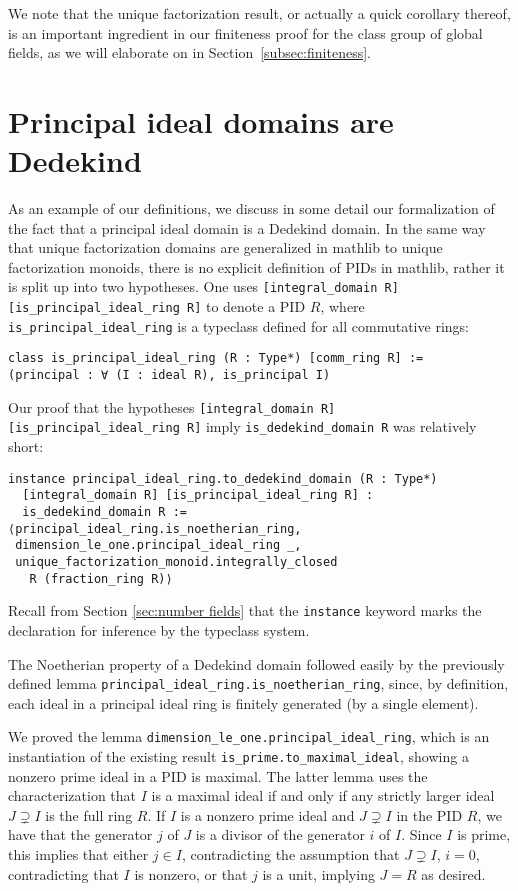 \documentclass[sn-mathphys]{sn-jnl}%
\newcommand{\lean}[1]{\texttt{#1}\xspace}
\newcommand{\mathlib}{\textsf{mathlib}\xspace}
\begin{document}
We note that the unique factorization result, or actually a quick corollary thereof, is an important ingredient in our finiteness proof for the class group of global fields, as we will elaborate on in Section~\ref{subsec:finiteness}.

\section{Principal ideal domains are Dedekind}

As an example of our definitions, we discuss in some detail our formalization of the fact that a principal ideal domain is a Dedekind domain.
In the same way that unique factorization domains are generalized in \mathlib to unique factorization monoids,
there is no explicit definition of PIDs in \mathlib, rather it is split up into two hypotheses.
One uses \lean{[integral\_domain R] [is\_principal\_ideal\_ring R]} to denote a PID $R$,
where \lean{is\_principal\_\-ideal\_\-ring} is a typeclass defined for all commutative rings:
\begin{lstlisting}
class is_principal_ideal_ring (R : Type*) [comm_ring R] :=
(principal : ∀ (I : ideal R), is_principal I)
\end{lstlisting}

Our proof that the hypotheses \lean{[integral\_domain R] [is\_principal\_\-ideal\_\-ring R]} imply \lean{is\_dedekind\_domain R} was relatively short:
\begin{lstlisting}
instance principal_ideal_ring.to_dedekind_domain (R : Type*)
  [integral_domain R] [is_principal_ideal_ring R] :
  is_dedekind_domain R :=
⟨principal_ideal_ring.is_noetherian_ring,
 dimension_le_one.principal_ideal_ring _,
 unique_factorization_monoid.integrally_closed
   R (fraction_ring R)⟩
\end{lstlisting}
Recall from Section \ref{sec:number fields} that the \lean{instance} keyword marks the declaration for inference by the typeclass system.

The Noetherian property of a Dedekind domain followed easily by the previously defined lemma \lean{principal\_ideal\_ring.is\_noetherian\_ring}, since, by definition, each ideal in a principal ideal ring is finitely generated (by a single element).

We proved the lemma \lean{dimension\_le\_one.principal\_ideal\_ring}, which is an instantiation of the existing result \lean{is\_prime.to\_maximal\_ideal}, showing a nonzero prime ideal in a PID is maximal.
The latter lemma uses the characterization that $I$ is a maximal ideal if and only if any strictly larger ideal $J\supsetneq I$ is the full ring $R$.
If $I$ is a nonzero prime ideal and $J \supsetneq I$ in the PID $R$, we have that the generator $j$ of $J$ is a divisor of the generator $i$ of $I$. Since $I$ is prime, this implies that either $j \in I$, contradicting the assumption that $J \supsetneq I$, $i = 0$, contradicting that $I$ is nonzero, or that $j$ is a unit, implying $J = R$ as desired.
\end{document}
